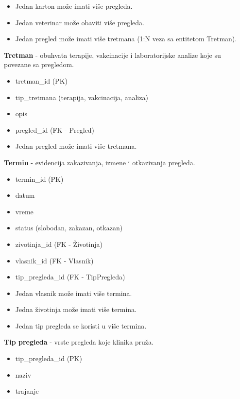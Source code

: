 \begin{itemize}{Veze:}
    \item Jedan karton može imati više pregleda.
    \item Jedan veterinar može obaviti više pregleda.
    \item Jedan pregled može imati više tretmana (1:N veza sa entitetom Tretman).
\end{itemize}

\indent\textbf{Tretman} - obuhvata terapije, vakcinacije i laboratorijske analize koje su povezane sa pregledom.
\begin{itemize}{Atributi:}
    \item tretman\_id (PK)
    \item tip\_tretmana (terapija, vakcinacija, analiza)
    \item opis
    \item pregled\_id (FK - Pregled)
\end{itemize}

\begin{itemize}{Veze:}
    \item Jedan pregled može imati više tretmana.
\end{itemize}

\indent\textbf{Termin} - evidencija zakazivanja, izmene i otkazivanja pregleda.
\begin{itemize}{Atributi:}
    \item termin\_id (PK)
    \item datum
    \item vreme
    \item status (slobodan, zakazan, otkazan)
    \item zivotinja\_id (FK - Životinja)
    \item vlasnik\_id (FK - Vlasnik)
    \item tip\_pregleda\_id (FK - TipPregleda)
\end{itemize}

\begin{itemize}{Veze:}
    \item Jedan vlasnik može imati više termina.
    \item Jedna životinja može imati više termina.
    \item Jedan tip pregleda se koristi u više termina.
\end{itemize}

\indent\textbf{Tip pregleda} - vrste pregleda koje klinika pruža.
\begin{itemize}{Atributi:}
    \item tip_pregleda_id (PK)
    \item naziv
    \item trajanje
\end{itemize}

